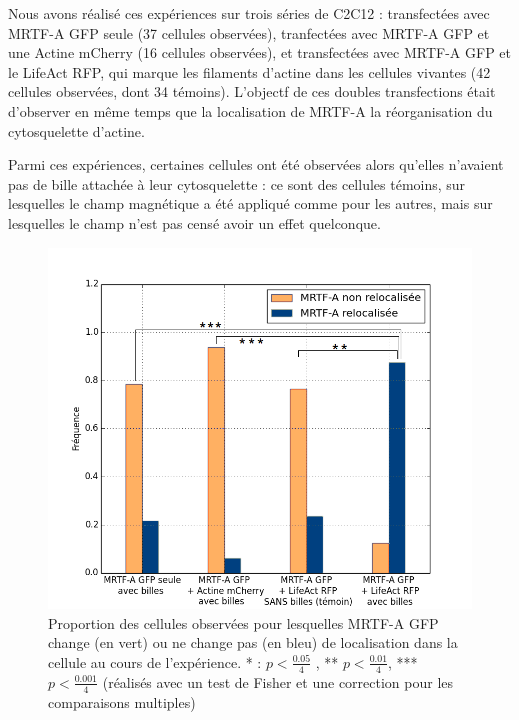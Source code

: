 Nous avons réalisé ces expériences sur trois séries de C2C12 : transfectées avec MRTF-A GFP seule (37 cellules observées), tranfectées avec MRTF-A GFP et une Actine mCherry (16 cellules observées), et transfectées avec MRTF-A GFP et le LifeAct RFP, qui marque les filaments d'actine dans les cellules vivantes (42 cellules observées, dont 34 témoins). 
L'objectf de ces doubles transfections était d'observer en même temps que la localisation de MRTF-A la réorganisation du cytosquelette d'actine. 

Parmi ces expériences, certaines cellules ont été observées alors qu'elles n'avaient pas de bille attachée à leur cytosquelette : ce sont des cellules témoins, sur lesquelles le champ magnétique a été appliqué comme pour les autres, mais sur lesquelles le champ n'est pas censé avoir un effet quelconque. 

\begin{figure}
\includegraphics[scale=0.4]{Figures/Pinces_MRTFA_stars_colors.png} 
\caption{Proportion des cellules observées pour lesquelles MRTF-A GFP change (en vert) ou ne change pas (en bleu) de localisation dans la cellule au cours de l'expérience. * : $p<\frac{0.05}{4}$ , ** $p<\frac{0.01}{4}$, *** $p<\frac{0.001}{4}$ (réalisés avec un test de Fisher et une correction pour les comparaisons multiples)\label{MRTF-A Pinces}}
\end{figure}

